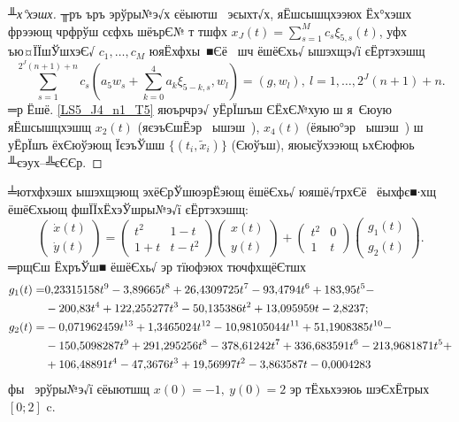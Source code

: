 \documentclass[12pt, a4paper, oneside]{article}
\begin{document}
\begin{proof}[╨х°хэшх]
╥ръ ъръ эрўры№э√х єёыютш  эєыхт√х, яЁшсышцхээюх Ёх°хэшх фрээющ чрфрўш сєфхь  шёърЄ№ т тшфх
$x_J(t)=\sum\limits_{s=1}^M c_s {\xi}_{5,s}(t)$,
уфх ъю¤ЇЇшЎшхэЄ√ $c_1,\dots, c_M$ юяЁхфхы ■Єё  шч ёшёЄхь√ ышэхщэ√ї єЁртэхэшщ
\[
\sum\limits_{s=1}^{2^J(n+1)+n} c_s \left(a_5w_{s}+\sum\limits_{k=0}^4 a_k\xi_{5-k,s},w_l\right)=(g,w_l),~l=1,\dots,2^J(n+1)+n.
\]
═р Ёшё. \ref{LS5_J4_n1_T5} яюърчрэ√ уЁрЇшъш ЄЁхЄ№хую ш я Єюую яЁшсышцхэшщ $x_2(t)$ (яєэъЄшЁэр  ышэш ), $x_4(t)$ (ёяыю°эр  ышэш ) ш уЁрЇшъ ёхЄюўэющ ЇєэъЎшш $\{(t_i,\tilde{x}_i)\}$ (Єюўъш), яюыєўхээющ ьхЄюфюь ╨єэух--╩єЄЄр.
\end{proof}
\begin{Ex}  ╧ютхфхэшх ышэхщэющ эхёЄрЎшюэрЁэющ ёшёЄхь√ юяшё√трхЄё  ёыхфє■∙хщ ёшёЄхьющ фшЇЇхЁхэЎшры№э√ї єЁртэхэшщ:
\[
\begin{pmatrix}{\dot x}(t) \\ {\dot y}(t)\end{pmatrix} = \begin{pmatrix} t^2 & 1-t \\ 1+t & t-t^2 \end{pmatrix} \begin{pmatrix} {x}(t) \\ {y}(t)\end{pmatrix}+  \begin{pmatrix} t^2 & 0 \\ 1 & t \end{pmatrix} \begin{pmatrix} {g}_1(t) \\ {g}_2(t)\end{pmatrix}.
\]
═рщЄш ЁхръЎш■ ёшёЄхь√ эр тїюфэюх тючфхщёЄтшх
\begin{align}
g_1(t) =& 0{,}23315158 t^9-3{,}89665 t^8+26{,}4309725 t^7-93{,}4794 t^6+183{,}95 t^5 - \notag\\
&-200{,}83 t^4+122{,}255277 t^3-50{,}135386 t^2+13{,}095959 t-2{,}8237;\notag\\
g_2(t) =& -0{,}071962459 t^{13}+1{,}3465024 t^{12}-10{,}98105044 t^{11} + 51{,}1908385 t^{10} -\notag\\
& - 150{,}5098287 t^9+291{,}295256 t^8-378{,}61242 t^7+336{,}683591 t^6-213{,}9681871 t^5 +\notag\\
& + 106{,}48891 t^4-47{,}3676 t^3+19{,}56997 t^2-3{,}863587 t-0{,}0004283\notag
\end{align}
фы  эрўры№э√ї єёыютшщ $x(0)=-1,~y(0)=2$ эр тЁхьхээюь шэЄхЁтрых $[0;2]$ c.
\end{Ex}
\end{document}

